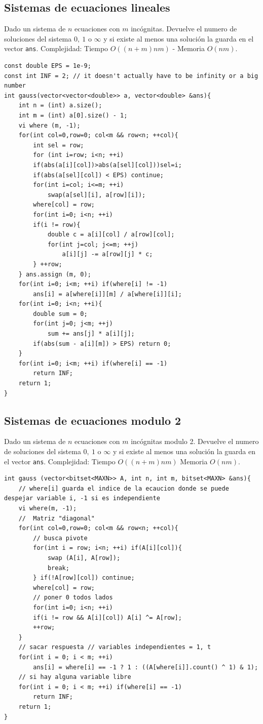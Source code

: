 \documentclass[12 pts,spanish,mexico]{article}
\numberwithin{equation}{section}
\begin{document}
\begin{multicols}{2}
\subsection{Sistemas de ecuaciones lineales }
Dado un sistema de $n$ ecuaciones  con $m$ incógnitas. Devuelve el numero de soluciones del sistema $0, \ 1 $ o $\infty$ y si existe al menos una solución la guarda en el vector \texttt{ans}. Complejidad: Tiempo $O(  (n+m)nm ) $ - Memoria $O(nm)$.
\begin{verbatim}
const double EPS = 1e-9;
const int INF = 2; // it doesn't actually have to be infinity or a big number
int gauss(vector<vector<double>> a, vector<double> &ans){
    int n = (int) a.size();
    int m = (int) a[0].size() - 1;
    vi where (m, -1);
    for(int col=0,row=0; col<m && row<n; ++col){
        int sel = row;
        for (int i=row; i<n; ++i)
        if(abs(a[i][col])>abs(a[sel][col]))sel=i;
        if(abs(a[sel][col]) < EPS) continue;
        for(int i=col; i<=m; ++i)
            swap(a[sel][i], a[row][i]);
        where[col] = row;
        for(int i=0; i<n; ++i)
        if(i != row){
            double c = a[i][col] / a[row][col];
            for(int j=col; j<=m; ++j)
                a[i][j] -= a[row][j] * c;
        } ++row;
    } ans.assign (m, 0);
    for(int i=0; i<m; ++i) if(where[i] != -1)
        ans[i] = a[where[i]][m] / a[where[i]][i];
    for(int i=0; i<n; ++i){
        double sum = 0;
        for(int j=0; j<m; ++j)
            sum += ans[j] * a[i][j];
        if(abs(sum - a[i][m]) > EPS) return 0;
    }
    for(int i=0; i<m; ++i) if(where[i] == -1)
        return INF;
    return 1;
}
\end{verbatim}


\subsection{Sistemas de ecuaciones modulo 2}
Dado un sistema de $n$ ecuaciones  con $m$ incógnitas modulo 2. Devuelve el numero de soluciones del sistema $0, \ 1 $ o $\infty$ y si existe al menos una solución la guarda en el vector \texttt{ans}. Complejidad: Tiempo $O(  (n+m)nm ) $  Memoria $O(nm)$.

\begin{verbatim}
int gauss (vector<bitset<MAXN>> A, int n, int m, bitset<MAXN> &ans){
    // where[i] guarda el indice de la ecaucion donde se puede despejar variable i, -1 si es independiente
    vi where(m, -1);
    //  Matriz "diagonal"
    for(int col=0,row=0; col<m && row<n; ++col){
        // busca pivote
        for(int i = row; i<n; ++i) if(A[i][col]){
            swap (A[i], A[row]);
            break;
        } if(!A[row][col]) continue;
        where[col] = row;
        // poner 0 todos lados
        for(int i=0; i<n; ++i)
        if(i != row && A[i][col]) A[i] ^= A[row];
        ++row;
    }
    // sacar respuesta // variables independientes = 1, t
    for(int i = 0; i < m; ++i)
        ans[i] = where[i] == -1 ? 1 : ((A[where[i]].count() ^ 1) & 1);
    // si hay alguna variable libre
    for(int i = 0; i < m; ++i) if(where[i] == -1)
        return INF;
    return 1;
}
\end{verbatim}


\end{multicols}
\end{document}
